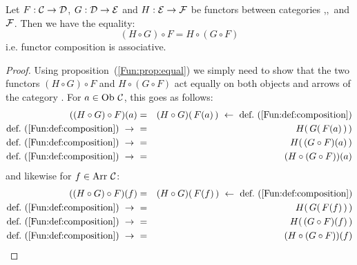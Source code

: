 \begin{prop}\label{Fun:prop:associative}
    Let $F:\mbox{$\cal C$}\to\mbox{$\cal D$}$, $G:\mbox{$\cal D$}\to\mbox{$\cal E$}$ and $H:\mbox{$\cal E$}\to{\cal F}$ be functors
    between categories \Cat,\Dat,\Eat\ and $\cal F$. Then we have the equality:
        \[
            (H\circ G)\circ F = H\circ (G\circ F)
        \]
    i.e. functor composition is associative.
\end{prop}
\begin{proof}
    Using proposition~(\ref{Fun:prop:equal}) we simply need to show that
    the two functors $(H\circ G)\circ F$ and $H\circ (G\circ F)$ act equally 
    on both objects and arrows of the category \Cat. For $a\in\mbox{\rm Ob}\ \mbox{$\cal C$}$, 
    this goes as follows:
        \begin{eqnarray*}((H\circ G)\circ F)(a)
            &=&(H\circ G)(\,F(a)\,)\ \leftarrow\ 
            \mbox{def.~(\ref{Fun:def:composition})}\\
            \mbox{def.~(\ref{Fun:def:composition})}\ \to\ 
            &=&H(\,G(\,F(a)\,)\,)\\
            \mbox{def.~(\ref{Fun:def:composition})}\ \to\ 
            &=&H(\,(G\circ F)(a)\,)\\
            \mbox{def.~(\ref{Fun:def:composition})}\ \to\ 
            &=&(H\circ (G\circ F))(a)
        \end{eqnarray*}
    and likewise for $f\in\mbox{\rm Arr}\ \mbox{$\cal C$}$:
        \begin{eqnarray*}((H\circ G)\circ F)(f)
            &=&(H\circ G)(\,F(f)\,)\ \leftarrow\ 
            \mbox{def.~(\ref{Fun:def:composition})}\\
            \mbox{def.~(\ref{Fun:def:composition})}\ \to\ 
            &=&H(\,G(\,F(f)\,)\,)\\
            \mbox{def.~(\ref{Fun:def:composition})}\ \to\ 
            &=&H(\,(G\circ F)(f)\,)\\
            \mbox{def.~(\ref{Fun:def:composition})}\ \to\ 
            &=&(H\circ (G\circ F))(f)
        \end{eqnarray*}
\end{proof}

